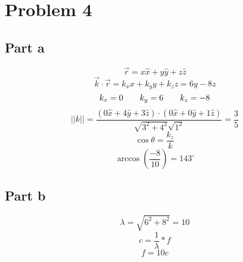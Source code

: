 \documentclass{article}
\begin{document}
\section*{Problem 4}
\subsection*{Part a}
\[\overrightarrow{r}=x\hat{x}+y\hat{y}+z\hat{z}\]
\[\overrightarrow{k}\cdot\overrightarrow{r}=k_xx+k_yy+k_zz=6y-8z\]
\[k_x=0\hspace{7 mm}k_y=6\hspace{7 mm}k_z=-8\]
\[||k||=\frac{\left(0\hat{x}+4\hat{y}+3\hat{z}\right)\cdot\left(0\hat{x}+0\hat{y}+1\hat{z}\right)}{\sqrt{3^2+4^2}\sqrt{1^2}}=\frac{3}{5}\]
\[\cos \theta=\frac{k_z}{k}\]
\[\arccos\left(\frac{-8}{10}\right)=143^{\circ}\]
\subsection*{Part b}
\[\lambda=\sqrt{6^2+8^2}=10\]
\[c=\frac{1}{\lambda}*f\]
\[f=10c\]
\end{document}
